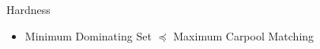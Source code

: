 \begin{frame}{Hardness}
\begin{itemize}
  \item Minimum Dominating Set $\preceq$ Maximum Carpool Matching
\end{itemize}

\vfill

\centering


\end{frame}